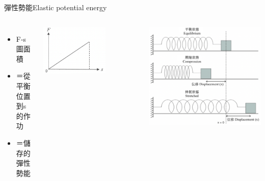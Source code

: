 \documentclass[beamer=true]{standalone}
\begin{document}
\begin{frame}{彈性勢能Elastic potential energy}
    \begin{columns}
        \begin{itemize}
            \setlength{\itemsep}{12pt}
            \item F-s圖面積
            \item []＝從平衡位置到s的作功
            \item []＝儲存的彈性勢能
        \end{itemize}\bigskip
        {\par\centering
            \includegraphics[width=0.66\textwidth]{assets/80e4b012.png}
            \par}
        {\par\centering
            \includegraphics[width=\textwidth]{assets/5c1cf9fc.png}
            \par}
    \end{columns}
\end{frame}
\end{document}

